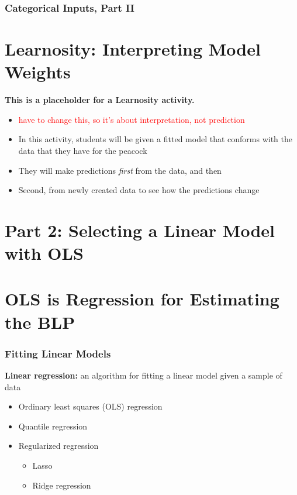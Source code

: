 \documentclass[12pt, block=fill]{beamer}
\newcommand{\paul}[1]{\textcolor{red}{#1}}
\begin{document}
\begin{frame}
  \frametitle{Categorical Inputs, Part II}

\end{frame} 

\section{Learnosity: Interpreting Model Weights}

\begin{frame}
  \textbf{This is a placeholder for a Learnosity activity.}

  \begin{itemize}
  \item \paul{have to change this, so it's about interpretation, not prediction}
  \item In this activity, students will be given a fitted model that
    conforms with the data that they have for the peacock
  \item They will make predictions \textit{first} from the data,
    and then
  \item Second, from newly created data to see how the predictions
    change
  \end{itemize} 
\end{frame}

\section{Part 2: Selecting a Linear Model with OLS}

\section{OLS is Regression for Estimating the BLP}

\begin{frame}
  \frametitle{Fitting Linear Models}
  
  \textbf{Linear regression:} an algorithm for fitting a linear model
  given a sample of data
  \begin{itemize}
  \item Ordinary least squares (OLS) regression
  \item Quantile regression
  \item Regularized regression
    \begin{itemize}
    \item Lasso
    \item Ridge regression
    \end{itemize} 
  \end{itemize} 
\end{frame}
\end{document}

